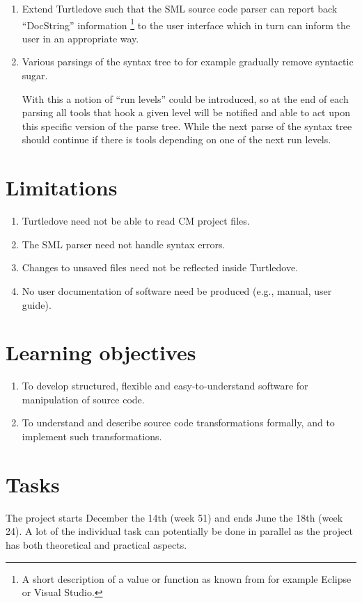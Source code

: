 \documentclass[a4paper,oneside,final]{article}
\begin{document}
\begin{enumerate}
\item Extend Turtledove such that the SML source code parser can report back
  ``DocString'' information \footnote{A short description of a value or function
    as known from for example Eclipse or Visual Studio.} to the user interface
  which in turn can inform the user in an appropriate way.

\item Various parsings of the syntax tree to for example gradually remove
  syntactic sugar.

  With this a notion of ``run levels'' could be introduced, so at the end of
  each parsing all tools that hook a given level will be notified and able to
  act upon this specific version of the parse tree. While the next parse of the
  syntax tree should continue if there is tools depending on one of the next run
  levels.
\end{enumerate}

\section{Limitations}
\begin{enumerate}
\item Turtledove need not be able to read CM project files.

\item The SML parser need not handle syntax errors.

\item Changes to unsaved files need not be reflected inside Turtledove.

\item No user documentation of software need be produced (e.g., manual, user
  guide).
\end{enumerate}

\section{Learning objectives}
\begin{enumerate}
\item To develop structured, flexible and easy-to-understand software for
  manipulation of source code.
\item To understand and describe source code transformations formally, and to
  implement such transformations.
\end{enumerate}

\section{Tasks}
The project starts December the 14th (week 51) and ends June the 18th (week
24). A lot of the individual task can potentially be done in parallel as the
project has both theoretical and practical aspects.
\end{document}
